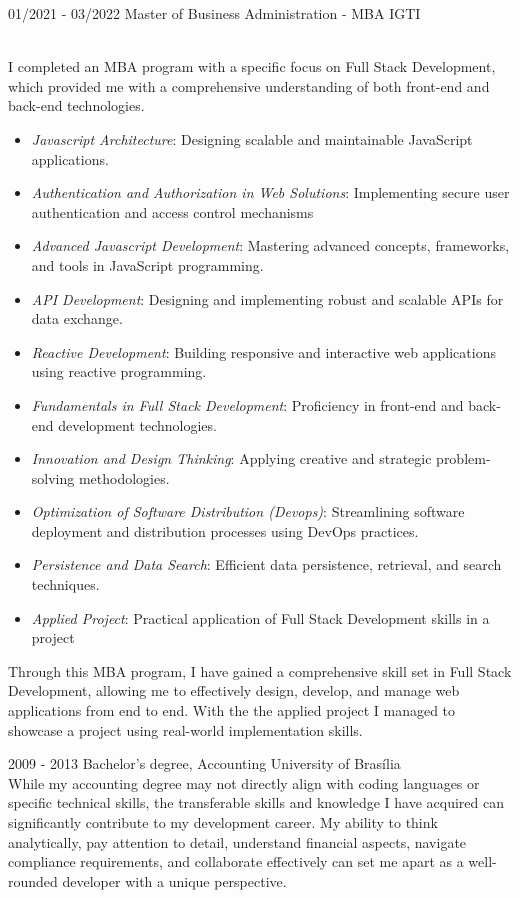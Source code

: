 \documentclass[letterpaper]{twentyonesecondcv} %
\begin{document}
{    \begin{twenty}
      \twentyitem
        {01/2021 - 03/2022}
        {Master of Business Administration - MBA}
        {IGTI}
        {\\ I completed an MBA program with a specific focus on Full Stack Development, which provided me with a comprehensive understanding of both front-end and back-end technologies.
        \begin{itemize}
          \item \textit{Javascript Architecture}: Designing scalable and maintainable JavaScript applications.
          \item \textit{Authentication and Authorization in Web Solutions}: Implementing secure user authentication and access control mechanisms
          \item \textit{Advanced Javascript Development}: Mastering advanced concepts, frameworks, and tools in JavaScript programming.
          \item \textit{API Development}: Designing and implementing robust and scalable APIs for data exchange.
          \item \textit{Reactive Development}: Building responsive and interactive web applications using reactive programming.
          \item \textit{Fundamentals in Full Stack Development}: Proficiency in front-end and back-end development technologies.
          \item \textit{Innovation and Design Thinking}: Applying creative and strategic problem-solving methodologies.
          \item \textit{Optimization of Software Distribution (Devops)}: Streamlining software deployment and distribution processes using DevOps practices.
          \item \textit{Persistence and Data Search}: Efficient data persistence, retrieval, and search techniques.
          \item \textit{Applied Project}: Practical application of Full Stack Development skills in a project
        \end{itemize}
        Through this MBA program, I have gained a comprehensive skill set in Full Stack Development, allowing me to effectively design, develop, and manage web applications from end to end.
        With the the applied project I managed to showcase a project using real-world implementation skills.
        }
      \twentyitem
        {2009 - 2013}
        {Bachelor's degree, Accounting}
        {University of Brasília}
        {\\
        While my accounting degree may not directly align with coding languages or specific technical skills, the transferable skills and knowledge I have acquired can significantly contribute to my development career. My ability to think analytically, pay attention to detail, understand financial aspects, navigate compliance requirements, and collaborate effectively can set me apart as a well-rounded developer with a unique perspective.}
    \end{twenty}
    
}
\end{document}
